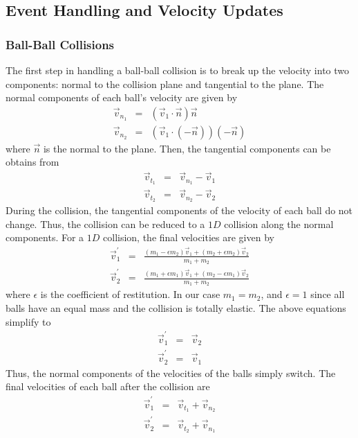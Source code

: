 \documentclass[12pt]{article}
\begin{document}
        \subsection{Event Handling and Velocity Updates}
            \subsubsection{Ball-Ball Collisions}
            The first step in handling a ball-ball collision is to break up the velocity into two components: normal to the collision plane
            and tangential to the plane. The normal components of each ball's velocity are given by
            \begin{eqnarray}
                \vec v_{n_1} &=& (\vec v_1 \cdot \vec n) \vec n       \nonumber \\
                \vec v_{n_2} &=& (\vec v_1 \cdot (-\vec n)) (-\vec n) \nonumber
            \end{eqnarray}
            where $\vec n$ is the normal to the plane. Then, the tangential components can be obtains from
            \begin{eqnarray}
                \vec v_{t_1} &=& \vec v_{n_1} - \vec v_1    \nonumber   \\
                \vec v_{t_2} &=& \vec v_{n_2} - \vec v_2    \nonumber
            \end{eqnarray}
            During the collision, the tangential components of the velocity of each ball do not change. Thus, the collision can be
            reduced to a $1D$ collision along the normal components. For a $1D$ collision, the final velocities are given by
            \begin{eqnarray}
                \vec v_1^\prime &=& \frac{(m_1 - \epsilon m_2) \vec v_1 + (m_2 + \epsilon m_2) \vec v_2}{m_1 + m_2}   \nonumber \\
                \vec v_2^\prime &=& \frac{(m_1 + \epsilon m_1) \vec v_1 + (m_2 - \epsilon m_1) \vec v_2}{m_1 + m_2}   \nonumber
            \end{eqnarray}
            where $\epsilon$ is the coefficient of restitution. In our case $m_1 = m_2$, and $\epsilon = 1$ since all balls have
            an equal mass and the collision is totally elastic. The above equations simplify to
            \begin{eqnarray}
                \vec v_1^\prime &=& \vec v_2    \nonumber   \\
                \vec v_2^\prime &=& \vec v_1    \nonumber
            \end{eqnarray}
            Thus, the normal components of the velocities of the balls simply switch. The final velocities of each ball after the collision are
            \begin{eqnarray}
                \vec v_1^\prime &=& \vec v_{t_1} + \vec v_{n_2} \nonumber   \\
                \vec v_2^\prime &=& \vec v_{t_2} + \vec v_{n_1} \label{equ:after_ball_ball}
            \end{eqnarray}
            
\end{document}
